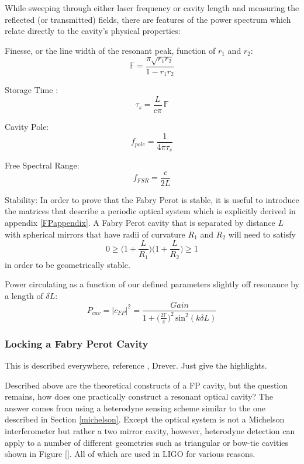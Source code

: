 		While sweeping through either laser frequency or cavity length and measuring the reflected (or transmitted) fields, there are features of the power spectrum which relate directly to the cavity's physical properties:
		
		Finesse, or the line width of the resonant peak, function of $r_1$ and $r_2$:
		\begin{equation}
		\mathbb{F} = \frac{\pi \sqrt{r_1 r_2}}{1- r_1 r_2}
		\end{equation}
		
		Storage Time :
		\begin{equation}
		\tau_{s} = \frac{L}{c \pi} \, \mathbb{F}
		\end{equation}
		
		Cavity Pole:
		\begin{equation}
		f_{pole} = \frac{1}{4\pi \tau_{s}}
		\end{equation}
	
		Free Spectral Range:
		\begin{equation}
		f_{FSR}  = \frac{c}{2L}
		\end{equation}
		
		Stability: In order to prove that the Fabry Perot is stable, it is useful to introduce the matrices that describe a periodic optical system which is explicitly derived in appendix \ref{FPappendix}.  A Fabry Perot cavity that is separated by distance $L$ with spherical mirrors that have radii of curvature $R_1$ and $R_2$ will need to satisfy 
		\begin{equation}\label{gfactor}
		0 \geq \bigg(1+\frac{L}{R_1}\bigg) \bigg(1+\frac{L}{R_2}\bigg) \geq 1
		\end{equation}
		in order to be geometrically stable.
		
		Power circulating as a function of our defined parameters slightly off resonance by a length of $\delta L$:
		\begin{equation}
		P_{cav} = \vert c_{FP} \vert^2 = \frac{Gain}{ 1 + \big(\frac{2\mathbb{F}}{\pi} \big)^2 \, \text{sin}^2(k \delta L) }
		\end{equation}
		\subsubsection{Locking a Fabry Perot Cavity}
		This is described everywhere, reference \cite{BlackPDH}, Drever. Just give the highlights.
		
		Described above are the theoretical constructs of a FP cavity, but the question remains, how does one practically construct a resonant optical cavity?  The answer comes from using a heterodyne sensing scheme similar to the one described in Section \ref{michelson}.  Except the optical system is not a Michelson interferometer but rather a two mirror cavity, however, heterodyne detection can apply to a number of different geometries such as triangular or bow-tie cavities shown in Figure [].  All of which are used in LIGO for various reasons.
		
